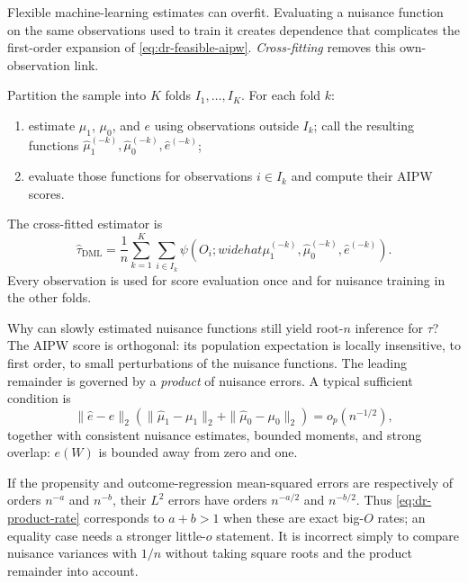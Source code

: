 Flexible machine-learning estimates can overfit.  Evaluating a nuisance function on
the same observations used to train it creates dependence that complicates the
first-order expansion of \eqref{eq:dr-feasible-aipw}.  \emph{Cross-fitting} removes
this own-observation link.

Partition the sample into $K$ folds $I_1,\ldots,I_K$.  For each fold $k$:

\begin{enumerate}
  \item estimate $\mu_1$, $\mu_0$, and $e$ using observations outside $I_k$;
  call the resulting functions
  $\widehat\mu_1^{(-k)},\widehat\mu_0^{(-k)},\widehat e^{(-k)}$;
  \item evaluate those functions for observations $i\in I_k$ and compute their
  AIPW scores.
\end{enumerate}

The cross-fitted estimator is
\begin{equation}
  \widehat\tau_{\mathrm{DML}}
  =\frac1n\sum_{k=1}^K\sum_{i\in I_k}
  \psi\!\left(O_i;widehat\mu_1^{(-k)},
  \widehat\mu_0^{(-k)},\widehat e^{(-k)}\right).
  \label{eq:dr-dml}
\end{equation}
Every observation is used for score evaluation once and for nuisance training in
the other folds.

Why can slowly estimated nuisance functions still yield root-$n$ inference for
$\tau$?  The AIPW score is orthogonal: its population expectation is locally
insensitive, to first order, to small perturbations of the nuisance functions.  The
leading remainder is governed by a \emph{product} of nuisance errors.  A typical
sufficient condition is
\begin{equation}
  \|\widehat e-e\|_2
  \left(\|\widehat\mu_1-\mu_1\|_2+
        \|\widehat\mu_0-\mu_0\|_2\right)
  =o_p(n^{-1/2}),
  \label{eq:dr-product-rate}
\end{equation}
together with consistent nuisance estimates, bounded moments, and strong overlap:
$e(W)$ is bounded away from zero and one.

If the propensity and outcome-regression mean-squared errors are respectively of
orders $n^{-a}$ and $n^{-b}$, their $L^2$ errors have orders $n^{-a/2}$ and
$n^{-b/2}$.  Thus \eqref{eq:dr-product-rate} corresponds to $a+b>1$ when these are
exact big-$O$ rates; an equality case needs a stronger little-$o$ statement.  It is
incorrect simply to compare nuisance variances with $1/n$ without taking square
roots and the product remainder into account.

